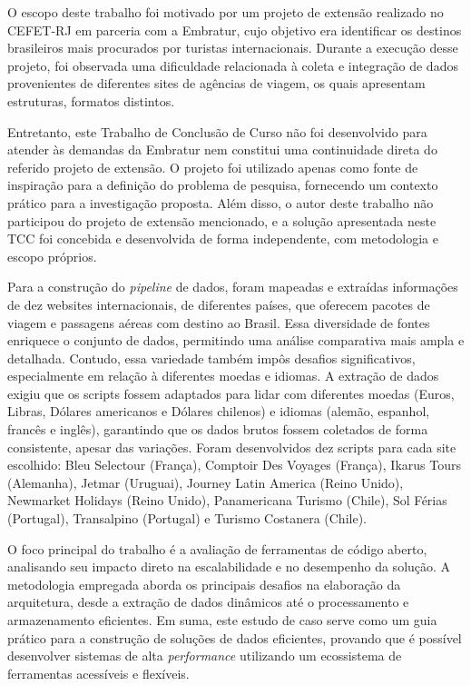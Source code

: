 \label{sec:ingestaodosdados}

O escopo deste trabalho foi motivado por um projeto de extensão realizado no CEFET-RJ em parceria com a Embratur, cujo objetivo era identificar os destinos brasileiros mais procurados por turistas internacionais. Durante a execução desse projeto, foi observada uma dificuldade relacionada à coleta e integração de dados provenientes de diferentes sites de agências de viagem, os quais apresentam estruturas, formatos distintos.

Entretanto, este Trabalho de Conclusão de Curso não foi desenvolvido para atender às demandas da Embratur nem constitui uma continuidade direta do referido projeto de extensão. O projeto foi utilizado apenas como fonte de inspiração para a definição do problema de pesquisa, fornecendo um contexto prático para a investigação proposta. Além disso, o autor deste trabalho não participou do projeto de extensão mencionado, e a solução apresentada neste TCC foi concebida e desenvolvida de forma independente, com metodologia e escopo próprios.

Para a construção do \textit{pipeline} de dados, foram mapeadas e extraídas informações de dez websites internacionais, de diferentes países, que oferecem pacotes de viagem e passagens aéreas com destino ao Brasil. Essa diversidade de fontes enriquece o conjunto de dados, permitindo uma análise comparativa mais ampla e detalhada. Contudo, essa variedade também impôs desafios significativos, especialmente em relação à diferentes moedas e idiomas. A extração de dados exigiu que os scripts fossem adaptados para lidar com diferentes moedas (Euros, Libras, Dólares americanos e Dólares chilenos) e idiomas (alemão, espanhol, francês e inglês), garantindo que os dados brutos fossem coletados de forma consistente, apesar das variações. Foram desenvolvidos dez scripts para cada site escolhido: Bleu Selectour (França), Comptoir Des Voyages (França), Ikarus Tours (Alemanha), Jetmar (Uruguai), Journey Latin America (Reino Unido), Newmarket Holidays (Reino Unido), Panamericana Turismo (Chile), Sol Férias (Portugal), Transalpino (Portugal) e Turismo Costanera (Chile).

O foco principal do trabalho é a avaliação de ferramentas de código aberto, analisando seu impacto direto na escalabilidade e no desempenho da solução. A metodologia empregada aborda os principais desafios na elaboração da arquitetura, desde a extração de dados dinâmicos até o processamento e armazenamento eficientes. Em suma, este estudo de caso serve como um guia prático para a construção de soluções de dados eficientes, provando que é possível desenvolver sistemas de alta \textit{performance} utilizando um ecossistema de ferramentas acessíveis e flexíveis. 

